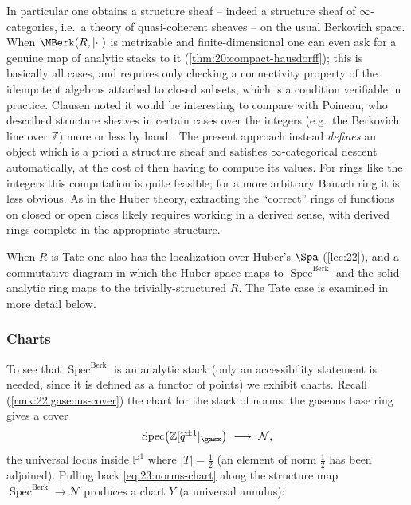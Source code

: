 \begin{remark}
\label{rmk:23:structure-sheaf}
In particular one obtains a structure sheaf -- indeed a structure sheaf of
$\infty$-categories, i.e.\ a theory of quasi-coherent sheaves -- on the usual
Berkovich space. When $\MBerk(R,\lvert\cdot\rvert)$ is metrizable and
finite-dimensional one can even ask for a genuine map of analytic stacks to it
(\cref{thm:20:compact-hausdorff}); this is basically all cases, and requires
only checking a connectivity property of the idempotent algebras attached to
closed subsets, which is a condition verifiable in practice. Clausen noted it
would be interesting to compare with Poineau, who described structure sheaves
in certain cases over the integers (e.g.\ the Berkovich line over $\mathbb Z$)
more or less by hand \cite{poineau2008ladroiteberkovichsur,poineau2012espacesberkovichsurz}.
The present approach instead \emph{defines} an object which is a priori a
structure sheaf and satisfies $\infty$-categorical descent automatically, at the
cost of then having to compute its values. For rings like the integers this
computation is quite feasible; for a more arbitrary Banach ring it is less
obvious. As in the Huber theory, extracting the ``correct'' rings of functions
on closed or open discs likely requires working in a derived sense, with derived
rings complete in the appropriate structure.
\end{remark}

\begin{remark}
\label{rmk:23:spa-comparison}
When $R$ is Tate one also has the localization over Huber's $\Spa$
(\cref{lec:22}), and a commutative diagram in which the Huber space maps to
$\operatorname{Spec}^{\mathrm{Berk}}$ and the solid analytic ring maps to the
trivially-structured $R$. The Tate case is examined in more detail below.
\end{remark}

\subsubsection*{Charts}

To see that $\operatorname{Spec}^{\mathrm{Berk}}$ is an analytic stack (only an
accessibility statement is needed, since it is defined as a functor of points)
we exhibit charts. Recall (\cref{rmk:22:gaseous-cover}) the chart for the stack
of norms: the gaseous base ring gives a cover
\begin{equation}
\label{eq:23:norms-chart}
\operatorname{Spec}\bigl(\mathbb Z[\widehat q^{\pm1}]_\gasx\bigr)
\ \longrightarrow\ \mathcal N ,
\end{equation}
the universal locus inside $\mathbb P^1$ where $\lvert T\rvert=\tfrac12$
(an element of norm $\tfrac12$ has been adjoined). Pulling back
\eqref{eq:23:norms-chart} along the structure map
$\operatorname{Spec}^{\mathrm{Berk}}\to\mathcal N$ produces a chart
$Y$ (a universal annulus):

